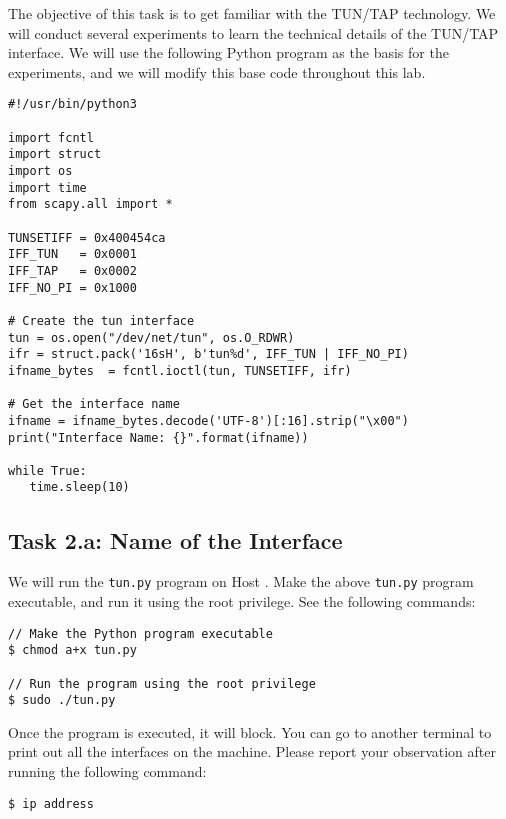 The objective of this task is to get familiar with the TUN/TAP technology. 
We will conduct several experiments to learn the technical details
of the TUN/TAP interface. We will use the following Python program
as the basis for the experiments, and we will modify this base 
code throughout this lab. 


\begin{lstlisting}[caption={Creating a TUN interface (\texttt{tun.py})}, label=vpn:list:create_tun]
#!/usr/bin/python3

import fcntl
import struct
import os
import time
from scapy.all import *

TUNSETIFF = 0x400454ca
IFF_TUN   = 0x0001
IFF_TAP   = 0x0002
IFF_NO_PI = 0x1000

# Create the tun interface
tun = os.open("/dev/net/tun", os.O_RDWR)
ifr = struct.pack('16sH', b'tun%d', IFF_TUN | IFF_NO_PI)
ifname_bytes  = fcntl.ioctl(tun, TUNSETIFF, ifr)

# Get the interface name
ifname = ifname_bytes.decode('UTF-8')[:16].strip("\x00")
print("Interface Name: {}".format(ifname))

while True:
   time.sleep(10)
\end{lstlisting}
 


\subsection{Task 2.a: Name of the Interface} 

We will run the \texttt{tun.py} program on Host \hostu.  
Make the above \texttt{tun.py} program executable, and run it using the 
root privilege. See the following commands: 

\begin{lstlisting}
// Make the Python program executable 
$ chmod a+x tun.py

// Run the program using the root privilege
$ sudo ./tun.py
\end{lstlisting}
 

Once the program is executed, it will block. You can go to 
another terminal to print out all the interfaces on the machine. Please 
report your observation after running the following command:

\begin{lstlisting}
$ ip address
\end{lstlisting}
 

